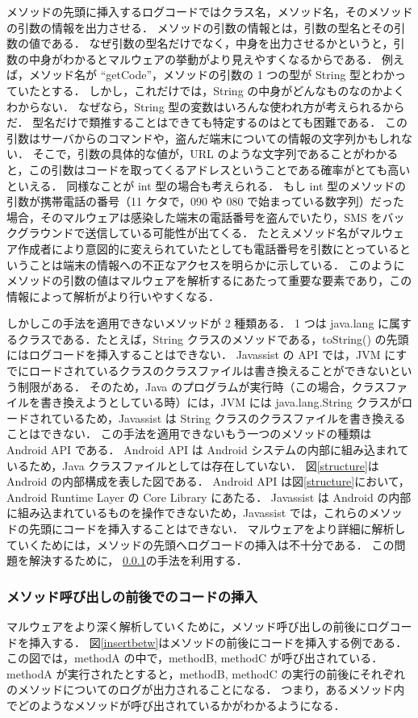 メソッドの先頭に挿入するログコードではクラス名，メソッド名，そのメソッドの引数の情報を出力させる．
メソッドの引数の情報とは，引数の型名とその引数の値である．
なぜ引数の型名だけでなく，中身を出力させるかというと，引数の中身がわかるとマルウェアの挙動がより見えやすくなるからである．
例えば，メソッド名が ``getCode''，メソッドの引数の 1 つの型が String 型とわかっていたとする．
しかし，これだけでは，String の中身がどんなものなのかよくわからない．
なぜなら，String 型の変数はいろんな使われ方が考えられるからだ．
型名だけで類推することはできても特定するのはとても困難である．
この引数はサーバからのコマンドや，盗んだ端末についての情報の文字列かもしれない．
そこで，引数の具体的な値が，URL のような文字列であることがわかると，この引数はコードを取ってくるアドレスということである確率がとても高いといえる．
同様なことが int 型の場合も考えられる．
もし int 型のメソッドの引数が携帯電話の番号（11 ケタで，090 や 080 で始まっている数字列）だった場合，そのマルウェアは感染した端末の電話番号を盗んでいたり，SMS をバックグラウンドで送信している可能性が出てくる．
たとえメソッド名がマルウェア作成者により意図的に変えられていたとしても電話番号を引数にとっているということは端末の情報への不正なアクセスを明らかに示している．
このようにメソッドの引数の値はマルウェアを解析するにあたって重要な要素であり，この情報によって解析がより行いやすくなる．

しかしこの手法を適用できないメソッドが 2 種類ある．
1 つは java.lang に属するクラスである．たとえば，String クラスのメソッドである，toString() の先頭にはログコードを挿入することはできない．
Javassist の API では，JVM にすでにロードされているクラスのクラスファイルは書き換えることができないという制限がある．
そのため，Java のプログラムが実行時（この場合，クラスファイルを書き換えようとしている時）には，JVM には java.lang.String クラスがロードされているため，Javassist は String  クラスのクラスファイルを書き換えることはできない．
この手法を適用できないもう一つのメソッドの種類は Android API である．
Android API は Android システムの内部に組み込まれているため，Java クラスファイルとしては存在していない．
図\ref{structure}は Android の内部構成を表した図である．
Android API は図\ref{structure}において，Android Runtime Layer の Core Library にあたる．
Javassist は Android の内部に組み込まれているものを操作できないため，Javassist では，これらのメソッドの先頭にコードを挿入することはできない．
マルウェアをより詳細に解析していくためには，メソッドの先頭へログコードの挿入は不十分である．
この問題を解決するために， \ref{methodcalls}の手法を利用する．

\subsubsection{メソッド呼び出しの前後でのコードの挿入}
\label{methodcalls}
マルウェアをより深く解析していくために，メソッド呼び出しの前後にログコードを挿入する．
図\ref{insertbetw}はメソッドの前後にコードを挿入する例である．
この図では，methodA の中で，methodB, methodC が呼び出されている．methodA が実行されたとすると，methodB, methodC の実行の前後にそれぞれのメソッドについてのログが出力されることになる．
つまり，あるメソッド内でどのようなメソッドが呼び出されているかがわかるようになる．

